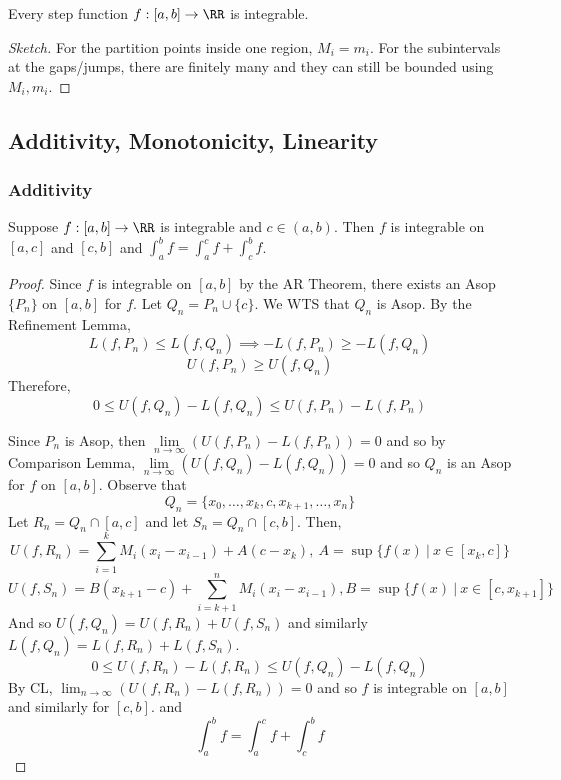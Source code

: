 \documentclass[12pt]{scrartcl}
\begin{document}
\begin{theorem}
  Every step function $f: [a,b] \to \RR$ is integrable. 

  \begin{proof}[Sketch]
    For the partition points inside one region, $M_i = m_i$. 
    For the subintervals at the gaps/jumps, there are finitely many and 
    they can still be bounded using $M_i, m_i$. 
  \end{proof}
\end{theorem}

\subsection{Additivity, Monotonicity, Linearity}

\subsubsection{Additivity}

\begin{theorem}
  Suppose $f: [a,b] \to \RR$ is integrable and $c \in (a,b)$. Then 
  $f$ is integrable on $[a,c]$ and $[c,b]$ and $\int_a^b f = \int_a^c f + \int_c^b f$.

  \begin{proof}
    Since $f$ is integrable on $[a,b]$ by the AR Theorem, there exists 
    an Asop $\{P_n\}$ on $[a,b]$ for $f$. Let $Q_n = P_n \cup \{c\}$. We 
    WTS that $Q_n$ is Asop. By the Refinement Lemma, 
    \[L(f, P_n) \leq L(f, Q_n) \implies -L(f, P_n) \geq -L(f, Q_n)\]
    \[U(f, P_n) \geq U(f, Q_n)\]
    Therefore,
    \[0 \leq U(f, Q_n) - L(f, Q_n) \leq U(f, P_n) - L(f, P_n)\]

    Since $P_n$ is Asop, then $\underset{n\to\infty}{\lim}(U(f, P_n) - L(f, P_n)) = 0$
    and so by Comparison Lemma, $\underset{n\to\infty}{\lim}(U(f, Q_n) - L(f, Q_n)) = 0$
    and so $Q_n$ is an Asop for $f$ on $[a,b]$. Observe that
    \[Q_n = \{x_0, \ldots, x_k, c, x_{k+1}, \ldots, x_n\}\]
    Let $R_n = Q_n \cap [a,c]$ and let $S_n = Q_n \cap [c,b]$. Then, 
    \[U(f, R_n) = \sum_{i=1}^k M_i(x_i - x_{i-1}) + A(c-x_k), \ A = \sup\{f(x) \ | \ x\in[x_k, c]\}\]
    \[U(f, S_n) = B(x_{k+1} - c) + \sum_{i=k+1}^n M_i(x_i - x_{i-1}), B = \sup\{f(x) \:|\: x \in [c, x_{k+1}]\}\]
    And so $U(f, Q_n) = U(f, R_n) + U(f, S_n)$ and similarly $L(f, Q_n) = L(f, R_n) + L(f, S_n)$.
    \[0 \leq U(f, R_n) - L(f, R_n) \leq U(f, Q_n) - L(f, Q_n)\]
    By CL, $\lim_{n\to\infty}(U(f, R_n) - L(f, R_n)) = 0$
    and so $f$ is integrable on $[a,b]$ and similarly for $[c,b]$. 
    and
    \[\int_a^b f= \int_a^c f+ \int_c^b f\]
  \end{proof}
\end{theorem}
\end{document}
